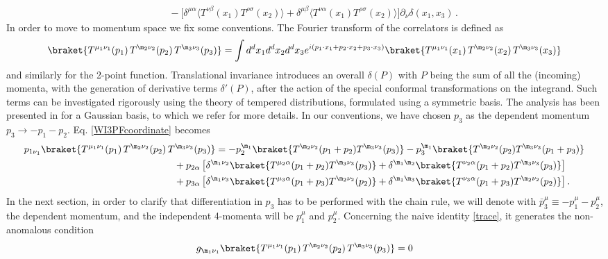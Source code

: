 \documentclass[a4paper,11pt,openright,twoside]{book}
\let\a=\alpha   \let\b=\beta   \let\g=\gamma   \let\d=\delta
\let\n=\nu      \let\x=\xi     \let\p=\pi      \let\r=\rho
\numberwithin{equation}{section}
\begin{document}
{{\begin{align}
	&\quad-
	\bigg[\delta^{\mu\alpha}\langle T^{\nu\beta}(x_1)T^{\rho\sigma}(x_2)\rangle
	+ \delta^{\mu\beta}\langle T^{\nu\alpha}(x_1)T^{\rho\sigma}(x_2)\rangle\bigg]\partial_\nu\d(x_1,x_3)\, .
\end{align}
In order to move to momentum space we fix some conventions. The Fourier transform of the correlators is defined as  
\begin{align}
	\braket{T^{\mu_1\nu_1}(p_1)\,T^{\m_2\n_2}(p_2)\,T^{\m_3\n_3}(p_3)}=\int d^d x_1 d^d x_2 d^d x_3 e^{i\left( p_1\cdot x_1 + p_2\cdot x_2 + p_3\cdot x_3\right)}\braket{T^{\mu_1\nu_1}(x_1)\,T^{\m_2\n_2}(x_2)\,T^{\m_3\n_3}(x_3)}
\end{align} 
and similarly for the 2-point function. Translational invariance  introduces an overall $\delta(P)$  with 
$P$ being the sum of all the (incoming) momenta, with the generation of derivative terms $\delta'(P)$, after the action of the special conformal transformations on the integrand.
Such terms can be investigated rigorously using the theory of tempered distributions, formulated using a symmetric basis. The analysis has been presented in \cite{Coriano:2018bbe} for a Gaussian basis, to which we refer for more details. In our conventions, we have chosen $p_3$ as the dependent momentum $ {p_3}\to -p_1 - p_2$. Eq. \eqref{WI3PFcoordinate} becomes
\begin{align}
	p_{1\n_1}\braket{T^{\mu_1\nu_1}(p_1)\,T^{\m_2\n_2}(p_2)\,T^{\m_3\n_3}({p_3})}&=-p_2^{\m_1}\braket{T^{\m_2\n_2}(p_1+p_2)T^{\m_3\n_3}({p_3})}-{p_3^{\m_1}}\braket{T^{\m_2\n_2}(p_2)T^{\m_3\n_3}(p_1+{p_3})}\notag\\
	&\hspace{-1.5cm}+p_{2\a}\left[\d^{\m_1\n_2}\braket{T^{\mu_2\a}(p_1+p_2)T^{\m_3\n_3}({p_3})}+\d^{\m_1\m_2}\braket{T^{\nu_2\a}(p_1+p_2)T^{\m_3\n_3}({p_3})}\right]\notag\\
	&\hspace{-1.5cm}+{p_{3\a}}\left[\d^{\m_1\n_3}\braket{T^{\mu_3\a}(p_1+{p_3})T^{\m_2\n_2}(p_2)}+\d^{\m_1\m_3}\braket{T^{\nu_3\a}(p_1+{p_3})T^{\m_2\n_2}(p_2)}\right].
	\label{long}
\end{align}
In the next section, in order to clarify that differentiation in $p_3$ has to be performed with the chain rule, we will denote with 
$\bar{p}_3^\mu\equiv -p_1^\mu - p_2^\mu$, the dependent momentum, and the independent 4-momenta will be $p_1^\mu$ and $p_2^\mu$. 
Concerning the naive identity \eqref{trace}, it generates the non-anomalous condition
\begin{equation}
	g_{\m_1\n_1}\braket{T^{\mu_1\nu_1}(p_1)\,T^{\m_2\n_2}(p_2)\,T^{\m_3\n_3}(p_3)}=0

\end{equation}}}
\end{document}
